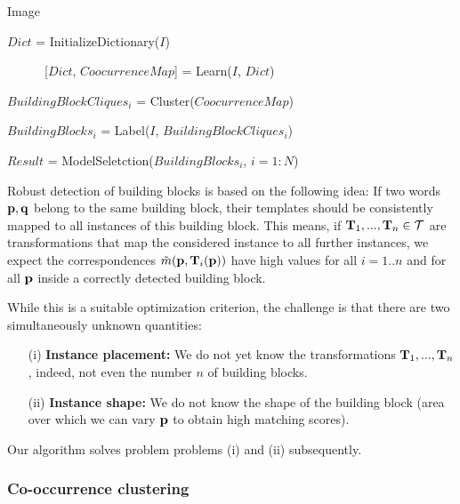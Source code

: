 \documentclass{acmtog}
\begin{document}
\begin{algorithm}
\caption{Image }\label{alg:ImageParsing}
\begin{algorithmic}[1]

     $Dict$ = InitializeDictionary($I$)
			
			
			    \ \ \ \ \ \ [$Dict$, $CoocurrenceMap$] = Learn($I$, $Dict$)
			
			\EndFor
			
\State			$BuildingBlockCliques_{i}$ = Cluster($CoocurrenceMap$)
			
\State			$BuildingBlocks_{i}$ = Label($I$, $BuildingBlockCliques_{i}$)
     \EndFor
			
\State $Result$ = ModelSeletction($BuildingBlocks_{i}$, $i = 1:N$)			
\end{algorithmic}
\end{algorithm}

Robust detection of building blocks is based on the following idea: If two words $\mathbf{p},\mathbf{q}$ belong to the same building block, their templates should be consistently mapped to all instances of this building block. This means, if $\mathbf{T}_1,...,\mathbf{T}_n \in \mathcal{T}$ are transformations that map the considered instance to all further instances, we expect the correspondences $\tilde{m}(\mathbf{p}, \mathbf{T}_i(\mathbf{p}))$ have high values for all $i=1..n$ and for all $\mathbf{p}$ inside a correctly detected building block. 

While this is a suitable optimization criterion, the challenge is that there are two simultaneously unknown quantities:
\begin{enumerate}
	\item[(i)] \textbf{Instance placement:} We do not yet know the transformations $\mathbf{T}_1,...,\mathbf{T}_n$, indeed, not even the number $n$ of building blocks.
	\item[(ii)] \textbf{Instance shape:} We do not know the shape of the building block (area over which we can vary $\mathbf{p}$ to obtain high matching scores).
\end{enumerate}
 
Our algorithm solves problem problems (i) and (ii) subsequently.

\subsubsection{Co-occurrence clustering}
\end{document}
